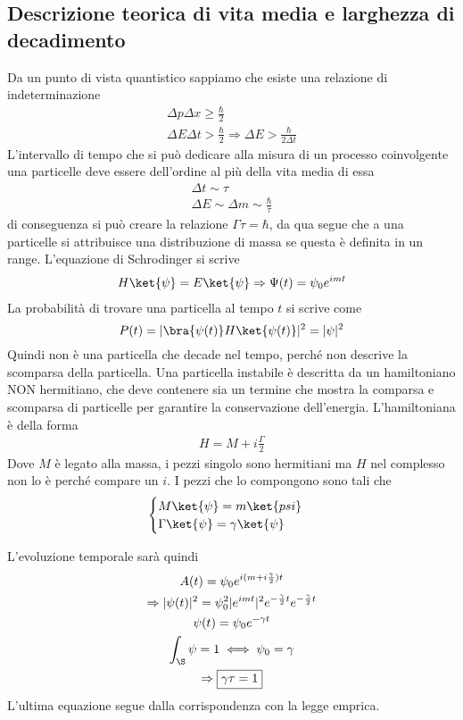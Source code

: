 \documentclass[12pt]{book}
\begin{document}
\subsection{Descrizione teorica di vita media e larghezza di decadimento}
Da un punto di vista quantistico sappiamo che esiste una relazione di indeterminazione
\begin{gather}
	\Delta p \Delta x \geq \frac{\hbar}{2}\\
	\Delta E \Delta t > \frac{\hbar}{2} \Rightarrow \boxed{\Delta E > \frac{\hbar}{2 \Delta t}}
\end{gather}  
L'intervallo di tempo che si può dedicare alla misura di un processo coinvolgente una particelle deve essere dell'ordine al più della vita media di essa
\begin{gather}
	\Delta t \sim \tau \\
	\Delta E \sim \Delta m \sim \frac{\hbar}{\tau}
\end{gather}
di conseguenza si può creare la relazione $\Gamma \tau = \hbar$, da qua segue che a una particelle si attribuisce una distribuzione di massa se questa è definita in un range. L'equazione di Schrodinger si scrive
\begin{gather}
	H \ket{\psi} = E \ket{\psi} \Rightarrow \Psi(t) = \psi_0 e^{imt}
\end{gather}  
La probabilità di trovare una particella al tempo $t$ si scrive come
\begin{equation}
	P(t) = | \bra{\psi(t) } H \ket{\psi(t)}|^2 = |\psi|^2
\end{equation}
Quindi non è una particella che decade nel tempo, perché non descrive la scomparsa della particella. Una particella instabile è descritta da un hamiltoniano NON hermitiano, che deve contenere sia un termine che mostra la comparsa e scomparsa di particelle per garantire la conservazione dell'energia. L'hamiltoniana è della forma 
\begin{gather}
	H = M + i \frac{\Gamma}{2}
\end{gather}
Dove $M$ è legato alla massa, i pezzi singolo sono hermitiani ma $H$ nel complesso non lo è perché compare un $i$. I pezzi che lo compongono sono tali che
\begin{equation}
	\begin{cases}
		M \ket{\psi} =m \ket{psi}\\
		\Gamma \ket{\psi} = \gamma \ket{\psi}
	\end{cases}
\end{equation}

L'evoluzione temporale sarà quindi
\begin{gather}
	A(t) = \psi_0 e^{i(m + i \frac{\gamma}{2} )t}\\
	\Rightarrow |\psi(t)|^2 = \psi_0^2 | e^{imt}|^2 e^{- \frac{\gamma}{2}t} e^{- \frac{\gamma}{2}t}\\
	\psi(t) =\psi_0 e^{-\gamma t}\\
	\int_\S \psi = 1 \iff \psi_0 = \gamma\\
	\Rightarrow \boxed{\gamma \tau=1}
\end{gather}
L'ultima equazione segue dalla corrispondenza con la legge emprica.
\end{document}
